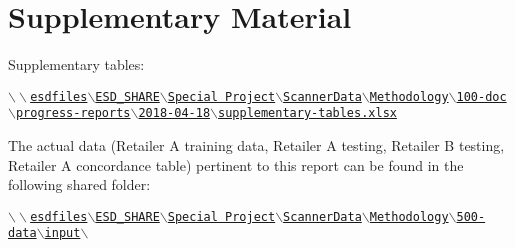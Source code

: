 
\section{Supplementary Material}
\setcounter{theorem}{0}
\setcounter{equation}{0}



\noindent
Supplementary tables:
\begin{center}
{\scriptsize\color{blue}
	\underline{\texttt{$\backslash\backslash$esdfiles$\backslash$ESD\_SHARE$\backslash$Special Project$\backslash$ScannerData$\backslash$Methodology$\backslash$100-doc$\backslash$progress-reports$\backslash$2018-04-18$\backslash$supplementary-tables.xlsx}}
}
\end{center}

\vskip 0.5cm
\noindent
The actual data (Retailer A training data, Retailer A testing, Retailer B testing, Retailer A concordance table)
pertinent to this report can be found in the following shared folder:
\begin{center}
{\small\color{blue}
	\underline{\texttt{$\backslash\backslash$esdfiles$\backslash$ESD\_SHARE$\backslash$Special Project$\backslash$ScannerData$\backslash$Methodology$\backslash$500-data$\backslash$input$\backslash$}}
}
\end{center}


